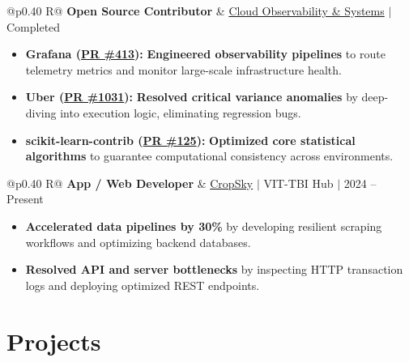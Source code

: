 \documentclass[a4paper,11pt]{article}
\newcommand{\subheading}[1]{\textbf{#1}}
\newcommand{\meta}[1]{{\fontsize{10}{12}\selectfont\textcolor[HTML]{3A3A3A}{#1}}}
\newcommand{\ulink}[2]{\href{#1}{#2}}
\begin{document}
\begin{tabularx}{\linewidth}{@{}p{0.40\linewidth} R@{}}
\subheading{Open Source Contributor} & \meta{\ulink{https://github.com/su-jin1425/My-Open-Source-Contributions}{Cloud Observability \& Systems} $|$ Completed}
\end{tabularx}
\begin{itemize}[nosep, leftmargin=1.5em, itemsep=2pt, topsep=2pt]
  \item {\color[HTML]{0A0A0A}\fontsize{11}{14}\selectfont \textbf{Grafana (\ulink{https://github.com/grafana/alloy-scenarios/pull/413}{PR \#413}):} \textbf{Engineered observability pipelines} to route telemetry metrics and monitor large-scale infrastructure health.}
  \item {\color[HTML]{0A0A0A}\fontsize{11}{14}\selectfont \textbf{Uber (\ulink{https://github.com/uber/causalml/pull/1031}{PR \#1031}):} \textbf{Resolved critical variance anomalies} by deep-diving into execution logic, eliminating regression bugs.}
  \item {\color[HTML]{0A0A0A}\fontsize{11}{14}\selectfont \textbf{scikit-learn-contrib (\ulink{https://github.com/scikit-learn-contrib/forest-confidence-interval/pull/125}{PR \#125}):} \textbf{Optimized core statistical algorithms} to guarantee computational consistency across environments.}
\end{itemize}

\begin{tabularx}{\linewidth}{@{}p{0.40\linewidth} R@{}}
\subheading{App / Web Developer} & \meta{\ulink{https://sites.google.com/view/cropsky/home}{CropSky} $|$ VIT-TBI Hub $|$ 2024 -- Present}
\end{tabularx}
\begin{itemize}[nosep, leftmargin=1.5em, itemsep=2pt, topsep=2pt]
  \item {\color[HTML]{0A0A0A}\fontsize{11}{14}\selectfont \textbf{Accelerated data pipelines by 30\%} by developing resilient scraping workflows and optimizing backend databases.}
  \item {\color[HTML]{0A0A0A}\fontsize{11}{14}\selectfont \textbf{Resolved API and server bottlenecks} by inspecting HTTP transaction logs and deploying optimized REST endpoints.}
\end{itemize}

\section{Projects}
\vspace{2pt}
\end{document}
